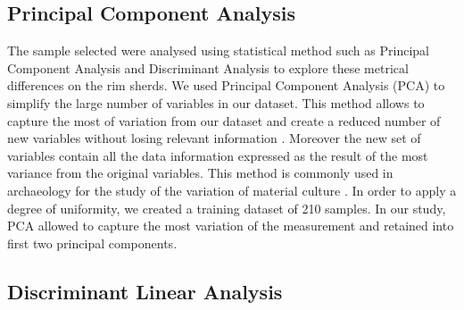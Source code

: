 \documentclass[review]{elsarticle}
\begin{document}
\subsection{Principal Component Analysis}

The sample selected were analysed using statistical method such as Principal Component Analysis and Discriminant Analysis to explore these metrical differences on the rim sherds. We used Principal Component Analysis (PCA) to simplify the large number of variables in our dataset. This method allows to capture the most of variation from our dataset and create a reduced number of new variables without losing relevant information \citep{jolliffe_principal_2002, shennan_quantifying_1997}. Moreover the new set of variables contain all the data information expressed as the result of the most variance from the original variables. This method is commonly used in archaeology for the study of the variation of material culture \citep{li_crossbows_2014, schillinger_differences_2016}. In order to apply a degree of uniformity, we created a training dataset of 210 samples. In our study, PCA allowed to capture the most variation of the measurement and retained into first two principal components. 


\subsection{Discriminant Linear Analysis} 
\end{document}
